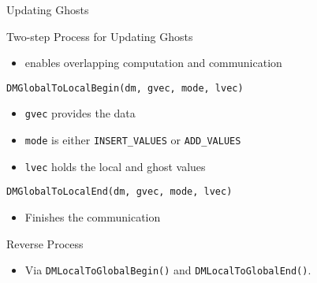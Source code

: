 \begin{frame}{Updating Ghosts}

\begin{block}{Two-step Process for Updating Ghosts}
 \begin{itemize}
  \item enables overlapping computation and communication
 \end{itemize}
\end{block}
 

\begin{block}{\lstinline|DMGlobalToLocalBegin(dm, gvec, mode, lvec)|}
  \begin{itemize}
    \item \lstinline|gvec| provides the data 
    \item \lstinline|mode| is either \lstinline|INSERT_VALUES| or \lstinline|ADD_VALUES|
    \item \lstinline|lvec| holds the local and ghost values
  \end{itemize}
\end{block}

\begin{block}{\lstinline|DMGlobalToLocalEnd(dm, gvec, mode, lvec)|}
  \begin{itemize}
    \item Finishes the communication
  \end{itemize}
\end{block}

\medskip

\begin{block}{Reverse Process}
  \begin{itemize}
   \item Via \lstinline|DMLocalToGlobalBegin()| and \lstinline|DMLocalToGlobalEnd()|.
  \end{itemize}
\end{block}
 
\end{frame}
